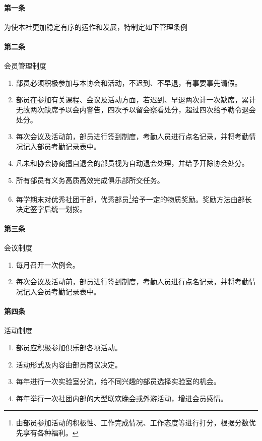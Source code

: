 \documentclass{club}
\begin{document}
\paragraph{第一条} 为使本社更加稳定有序的运作和发展，特制定如下管理条例

\paragraph{第二条} 会员管理制度
\begin{enumerate}
	\item 部员必须积极参加与本协会和活动，不迟到、不早退，有事要事先请假。
	\item 部员在参加有关课程、会议及活动方面，若迟到、早退两次计一次缺席，累计无故两次缺席予以会内警告，四次予以留会察看处分，超过四次给予勒令退会处分。
	\item 每次会议及活动前，部员进行签到制度，考勤人员进行点名记录，并将考勤情况记入部员考勤记录表中。
	\item 凡未和协会协商擅自退会的部员视为自动退会处理，并给予开除协会处分。
	\item 所有部员有义务高质高效完成俱乐部所交任务。
	\item 每学期末对优秀社团干部，优秀部员\footnote{由部员参加活动的积极性、工作完成情况、工作态度等进行打分，根据分数优先享有各种福利。}给予一定的物质奖励。奖励方法由部长决定签字后统一划拨。
\end{enumerate}

\paragraph{第三条} 会议制度
\begin{enumerate}
	\item 每月召开一次例会。
	\item 每次会议及活动前，部员进行签到制度，考勤人员进行点名记录，并将考勤情况记入会员考勤记录表中。
\end{enumerate}

\paragraph{第四条} 活动制度
\begin{enumerate}
	\item 部员应积极参加俱乐部各项活动。
	\item 活动形式及内容由部员商议决定。
	\item 每年进行一次实验室分流，给不同兴趣的部员选择实验室的机会。
	\item 每年举行一次社团内部的大型联欢晚会或外游活动，增进会员感情。
\end{enumerate}
\end{document}

